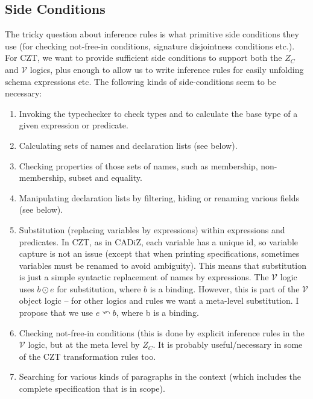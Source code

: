 \documentclass{article}
\newcommand{\V}{\mathcal{V}}
\newcommand{\substitute}{\mathrel{\curvearrowleft}}  %
\begin{document}
\subsection{Side Conditions}

The tricky question about inference rules is what primitive
side conditions they use (for checking not-free-in conditions,
signature disjointness conditions etc.).  
For CZT, we want to provide sufficient side conditions
to support both the $Z_C$ and $\V$ logics, plus enough to
allow us to write inference rules for easily unfolding schema
expressions etc.  The following kinds of side-conditions seem
to be necessary:

\begin{enumerate}
\item Invoking the typechecker to check types and to calculate
  the base type of a given expression or predicate.
\item Calculating sets of names and declaration lists (see below).
\item Checking properties of those sets of names, such as membership,
  non-membership, subset and equality.
\item Manipulating declaration lists by filtering, hiding
  or renaming various fields (see below).
\item Substitution (replacing variables by expressions)
  within expressions and predicates.  In CZT, as in CADiZ,
  each variable has a unique id, so variable capture is not an 
  issue (except that when printing specifications, sometimes
  variables must be renamed to avoid ambiguity).  This means that
  substitution is just a simple syntactic replacement of names
  by expressions.  The $\V$ logic uses $b \odot e$ for substitution,
  where $b$ is a binding.  However, this is part of the $\V$ object
  logic -- for other logics and rules we want a meta-level substitution.
  I propose that we use $e \substitute b$, where b is a binding.
\item Checking not-free-in conditions (this is done by explicit
  inference rules in the $\V$ logic, but at the meta level by $Z_C$.
  It is probably useful/necessary in some of the CZT transformation
  rules too.
\item Searching for various kinds of paragraphs in the context
  (which includes the complete specification that is in scope).
\end{enumerate}
\end{document}
